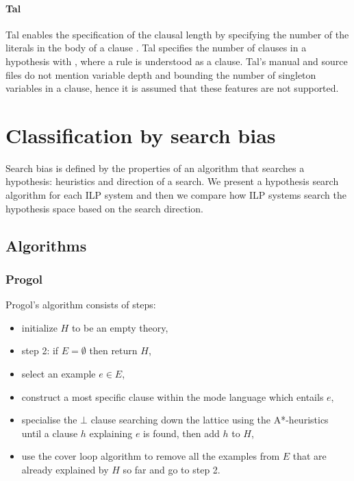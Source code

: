 \paragraph{Tal}
Tal enables the specification of the clausal length by specifying the number of the literals in the body of a clause \cite{corapi2010inductive}. Tal specifies the number of clauses in a hypothesis with \cite{corapi2010inductive}, where a rule is understood as a clause. Tal's manual and source files do not mention variable depth and bounding the number of singleton variables in a clause, hence it is assumed that these features are not supported.

\section{Classification by search bias}\label{classification_by_search_bias}
Search bias\cite{nienhuys1997foundations} is defined by the properties of an algorithm that searches a hypothesis: heuristics and direction of a search. We present a hypothesis search algorithm for each ILP system and then 
we compare how ILP systems search the hypothesis space based on the search direction.
\subsection{Algorithms}

\subsubsection{Progol\cite{muggleton1995inverse}\cite{kimber2012learning}}
Progol's algorithm consists of steps:
\begin{itemize}
\item initialize $H$ to be an empty theory,
\item step 2: if $E=\emptyset$ then return $H$,
\item select an example $e \in E$,
\item construct a most specific clause within the mode language which entails $e$,
\item specialise the $\bot$ clause searching down the lattice using the A*-heuristics until a clause $h$ explaining $e$ is found, then add $h$ to $H$,
\item use the cover loop algorithm to remove all the examples from $E$ that are already explained by $H$ so far and go to step 2.
\end{itemize}

